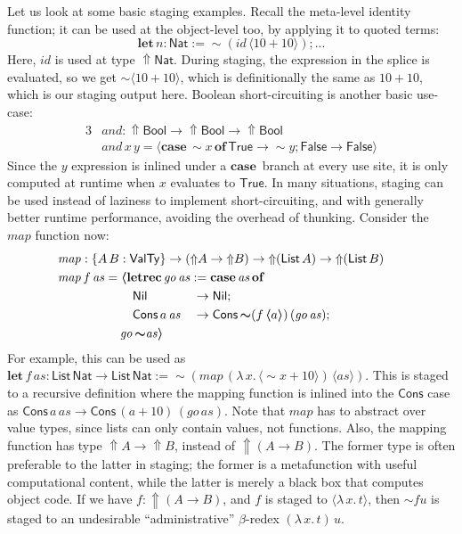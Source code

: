 \documentclass[acmsmall,screen,review,anonymous]{acmart}
\newcommand{\mit}[1]{\mathit{#1}}
\newcommand{\msf}[1]{\mathsf{#1}}
\newcommand{\mbf}[1]{\mathbf{#1}}
\newcommand{\bs}[1]{\boldsymbol{#1}}
\newcommand{\ind}{\hspace{1em}}
\newcommand{\lam}{\lambda\,}
\newcommand{\letrec}{\mbf{letrec}\,}
\newcommand{\of}{\mbf{of}\,}
\newcommand{\go}{\mit{go}}
\newcommand{\letdef}{\mbf{let\,}}
\newcommand{\map}{\mit{map}}
\newcommand{\vas}{\mit{as}}
\newcommand{\List}{\msf{List}}
\newcommand{\Nil}{\msf{Nil}}
\newcommand{\Cons}{\msf{Cons}}
\newcommand{\Bool}{\msf{Bool}}
\newcommand{\case}{\mbf{case\,}}
\newcommand{\Lift}{{\Uparrow}}
\newcommand{\Up}{{\Uparrow}}
\newcommand{\spl}{{\bs{\sim}}}
\newcommand{\ql}{{\bs{\langle}}}
\newcommand{\qr}{{\bs{\rangle}}}
\newcommand{\VTy}{\msf{ValTy}}
\newcommand{\True}{\msf{True}}
\newcommand{\False}{\msf{False}}
\newcommand{\Nat}{\msf{Nat}}
\theoremstyle{remark}
\newcommand{\id}{\mit{id}}
\newcommand{\qt}[1]{\ql#1\qr}
\begin{document}
Let us look at some basic staging examples. Recall the meta-level identity
function; it can be used at the object-level too, by applying it to quoted
terms:
  \[ \letdef n : \Nat := \spl(\id\,\ql 10 + 10 \qr); ... \]
Here, $\id$ is used at type $\Lift \Nat$. During staging, the expression in the
splice is evaluated, so we get $\spl\ql 10 + 10 \qr$, which is definitionally
the same as $10 + 10$, which is our staging output here. Boolean
short-circuiting is another basic use-case:
\begin{alignat*}{3}
  &\mit{and} : \Up\Bool \to \Up\Bool \to \Up\Bool\\
  &\mit{and}\,x\,y = \ql\case \spl x\,\of \True \to \spl y; \False \to \False\qr
\end{alignat*}
Since the $y$ expression is inlined under a $\case$ branch at every use site, it
is only computed at runtime when $x$ evaluates to $\True$. In many situations,
staging can be used instead of laziness to implement short-circuiting, and with
generally better runtime performance, avoiding the overhead of thunking. Consider
the $\map$ function now:
\begin{alignat*}{3}
  & \hspace{-5em}\mathrlap{\map : \{A\,B : \VTy\} \to (\Up A \to \Up B) \to \Up (\List\,A) \to \Up(\List\,B)}\\
  & \hspace{-5em}\mathrlap{\map\,f\,\vas = \ql\letrec \go\,\vas := \case \vas\,\of}\\
  & \hspace{-5em}\ind\ind\ind\ind\ind \ind\Nil           &&\to \Nil;\\
  & \hspace{-5em}\ind\ind\ind\ind\ind \ind\Cons\,a\,\vas &&\to \Cons\,\spl(f\,\ql a \qr)\,(\go\,\vas);\\
  & \hspace{-5em}\ind\ind\ind\ind\ind\go\,\spl\vas \qr
\end{alignat*}
For example, this can be used as $\letdef f\,\vas : \List\,\Nat \to \List\,\Nat :=
\spl(\map\,(\lam x.\,\ql \spl x + 10 \qr)\,\qt{\vas}) $.  This is staged to a recursive
definition where the mapping function is inlined into the $\Cons$ case as
$\Cons\,a\,\vas \to \Cons\,(a + 10)\,(\go\,\vas)$.  Note that $\map$ has to
abstract over value types, since lists can only contain values, not functions. Also, the
mapping function has type $\Up A \to \Up B$, instead of $\Up (A \to B)$. The
former type is often preferable to the latter in staging; the former is
a metafunction with useful computational content, while the latter is merely a
black box that computes object code. If we have $f : \Up(A \to B)$, and $f$ is
staged to $\ql \lam x.\,t\qr$, then $\spl f u$ is staged to an
undesirable ``administrative'' $\beta$-redex $(\lam x.\,t)\,u$.
\end{document}
